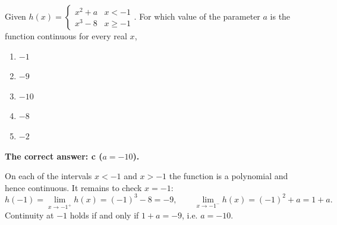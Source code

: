 
\begin{question}
Given $h(x)=\begin{cases}x^2+a & x<-1\\ x^3-8 & x\ge-1\end{cases}$. For which value of the parameter $a$ is the function continuous for every real $x$,
\begin{enumerate}
  \item $-1$
  \item $-9$
  \item $-10$
  \item $-8$
  \item $-2$
\end{enumerate}
\end{question}

\begin{solution}
\textbf{The correct answer: c ($a=-10$).}

On each of the intervals $x<-1$ and $x>-1$ the function is a polynomial and hence continuous. It remains to check $x=-1$:
\[ h(-1)=\lim_{x\to-1^+}h(x)=(-1)^3-8=-9,\qquad \lim_{x\to-1^-}h(x)=(-1)^2+a=1+a . \]
Continuity at $-1$ holds if and only if $1+a=-9$, i.e. $a=-10$.
\end{solution}
